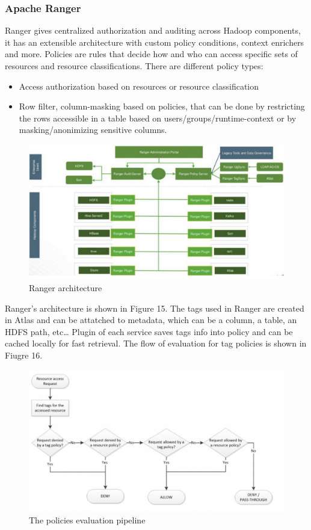 \subsubsection{Apache Ranger}
Ranger gives centralized authorization and auditing across Hadoop components, it has an extensible architecture with custom policy conditions, context enrichers and more. \n
Policies are rules that decide how and who can access specific sets of resources and resource classifications. There are different policy types:
\begin{itemize}
    \item Access authorization based on resources or resource classification
    \item Row filter, column-masking based on policies, that can be done by restricting the rows accessible in a table based on users/groups/runtime-context or by masking/anonimizing sensitive columns.
\end{itemize}
\begin{figure}
    \centering
    \includegraphics[scale=0.2]{Images/Ranger_architecture.jpeg}
    \caption{Ranger architecture}
\end{figure}
Ranger's architecture is shown in Figure 15. \n
The tags used in Ranger are created in Atlas and can be attatched to metadata, which can be a column, a table, an HDFS path, etc\dots \n
Plugin of each service saves tags info into policy and can be cached locally for fast retrieval. The flow of evaluation for tag policies is shown in Fiugre 16.
\begin{figure}
    \centering
    \includegraphics[scale=0.2]{Images/policies_evaluation.jpeg}
    \caption{The policies evaluation pipeline}
\end{figure}
